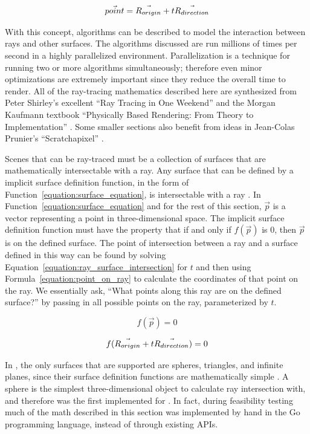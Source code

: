 \begin{equation}
  \label{equation:point_on_ray}
  \vec{point} = \vec{R_{origin}} + t\vec{R_{direction}}
\end{equation}

With this concept, algorithms can be described to model the interaction between rays and other surfaces. The algorithms discussed are run millions of times per second in a highly parallelized environment.
Parallelization is a technique for running two or more algorithms simultaneously; therefore even minor optimizations are extremely important since they reduce the overall time to render.
All of the ray-tracing mathematics described here are synthesized from Peter Shirley's excellent ``Ray Tracing in One Weekend'' \cite{shirley2016ray} and the Morgan Kaufmann textbook ``Physically Based Rendering: From Theory to Implementation'' \cite{pharr2016physically}.
Some smaller sections also benefit from ideas in Jean-Colas Prunier's ``Scratchapixel'' \cite{prunier2017triangle}.

Scenes that can be ray-traced must be a collection of surfaces that are mathematically intersectable with a ray.
Any surface that can be defined by a implicit surface definition function, in the form of Function~\ref{equation:surface_equation}, is intersectable with a ray \cite{pharr2016physically}.
In Function~\ref{equation:surface_equation} and for the rest of this section, $\vec{p}$ is a vector representing a point in three-dimensional space.
The implicit surface definition function must have the property that if and only if $f(\vec{p})$ is $0$, then $\vec{p}$ is on the defined surface.
The point of intersection between a ray and a surface defined in this way can be found by solving Equation~\ref{equation:ray_surface_intersection} for $t$ and then using Formula~\ref{equation:point_on_ray} to calculate the coordinates of that point on the ray.
We essentially ask, ``What points along this ray are on the defined surface?'' by passing in all possible points on the ray, parameterized by $t$.

\begin{equation}
  \label{equation:surface_equation}
  f(\vec{p}) = 0
\end{equation}

\begin{equation}
  \label{equation:ray_surface_intersection}
  f(\vec{R_{origin}} + t\vec{R_{direction}}) = 0
\end{equation}

In \name, the only surfaces that are supported are spheres, triangles, and infinite planes, since their surface definition functions are mathematically simple .
A sphere is the simplest three-dimensional object to calculate ray intersection with, and therefore was the first implemented for \name.
In fact, during feasibility testing much of the math described in this section was implemented by hand in the Go programming language, instead of through existing APIs.

